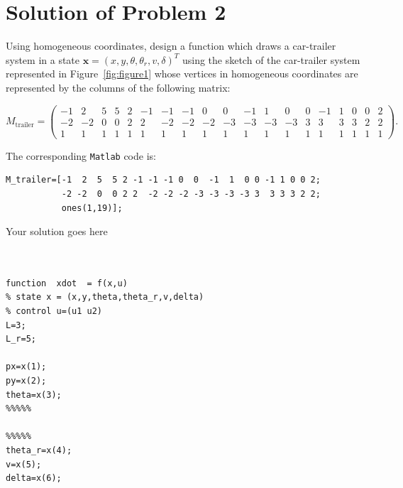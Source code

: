 \documentclass{article}
\begin{document}
\section*{Solution of Problem 2}

\begin{itemize}

{\color{gray}

\item[1)] Using homogeneous coordinates, design a function which draws a car-trailer system in a state $\mathbf{x} =
(x, y, \theta, \theta_r, v, \delta)^T$ using the sketch of the car-trailer system represented in Figure~\ref{fig:figure1} 
whose vertices in homogeneous coordinates are represented by the columns of the following matrix:

\begin{scriptsize}
 \begin{equation*}
M_{\text{trailer}} =
\begin{pmatrix}
-1 & 2  &5  &5 &2 &-1 &-1 &-1 &0  &0  &-1  &1  &0 &0 &-1 &1 &0 &0 &2 \\
-2 &-2 &0  &0 &2 &2  &-2 &-2 &-2 &-3 &-3 &-3 &-3 &3  &3 &3 &3 &2 &2\\
1 &1 &1  &1   &1   &1 &1 &1 &1 &1 &1 &1 &1 &1 &1 &1 &1 &1 &1
\end{pmatrix}.
\end{equation*}
\end{scriptsize}
The corresponding \texttt{Matlab} code is:
\begin{scriptsize}
\begin{verbatim}
M_trailer=[-1  2  5  5 2 -1 -1 -1 0  0  -1  1  0 0 -1 1 0 0 2; 
           -2 -2  0  0 2 2  -2 -2 -2 -3 -3 -3 -3 3  3 3 3 2 2;
           ones(1,19)];
\end{verbatim}                    
\end{scriptsize}                 
}                 
                    

Your solution goes here

\bigskip

\begin{tcolorbox}
[
title={File \texttt{car\_trailer\_f.m}}
]
\begin{scriptsize}
\begin{verbatim}


function  xdot  = f(x,u)
% state x = (x,y,theta,theta_r,v,delta)
% control u=(u1 u2)
L=3;
L_r=5;

px=x(1);
py=x(2);
theta=x(3);
%%%%%

%%%%%
theta_r=x(4);
v=x(5);
delta=x(6);


\end{verbatim}
\end{scriptsize}
\end{tcolorbox}
\end{itemize}
\end{document}
